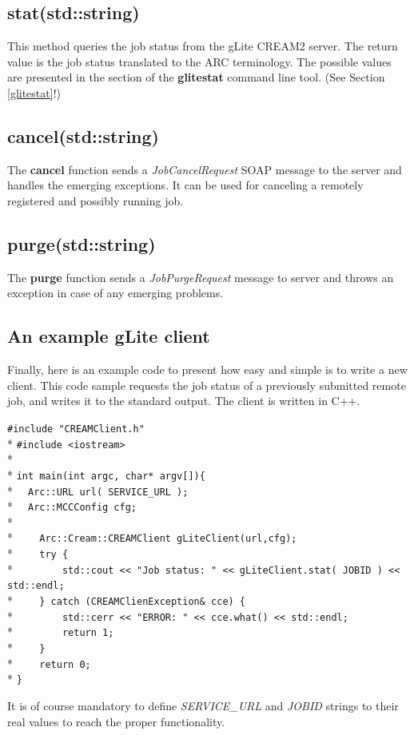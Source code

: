 \documentclass{article}
\begin{document}
\subsection{stat(std::string)}
This method queries the job status from the gLite CREAM2 server. The return value is the job status translated to the ARC terminology. The possible values are presented in the section of the \textbf{glitestat} command line tool. (See Section \ref{glitestat}!)
\subsection{cancel(std::string)}
The \textbf{cancel} function sends a \textit{JobCancelRequest} SOAP message to the server and handles the emerging exceptions. It can be used for canceling a remotely registered and possibly running job.
\subsection{purge(std::string)}
The \textbf{purge} function sends a \textit{JobPurgeRequest} message to server and throws an exception in case of any emerging problems.
\subsection{An example gLite client}
Finally, here is an example code to present how easy and simple is to write a new client. This code sample requests the job status of a previously submitted remote job, and writes it to the standard output. The client is written in C++.
\begin{framed}
\verb?#include "CREAMClient.h"?\\*
\verb?#include <iostream>?\\*
\\*
\verb?int main(int argc, char* argv[]){?\\*
\verb?  Arc::URL url( SERVICE_URL );?\\*
\verb?  Arc::MCCConfig cfg;?\\*
\\*
\verb?    Arc::Cream::CREAMClient gLiteClient(url,cfg);?\\*
\verb?    try {?\\*
\verb?        std::cout << "Job status: " << gLiteClient.stat( JOBID ) << std::endl;?\\*
\verb?    } catch (CREAMClienException& cce) {?\\*
\verb?        std::cerr << "ERROR: " << cce.what() << std::endl;?\\*
\verb?        return 1;?\\*
\verb?    }?\\*
\verb?    return 0;?\\*
\verb?}?
\end{framed}
It is of course mandatory to define \textit{SERVICE\_URL} and \textit{JOBID} strings to their real values to reach the proper functionality.
\end{document}
